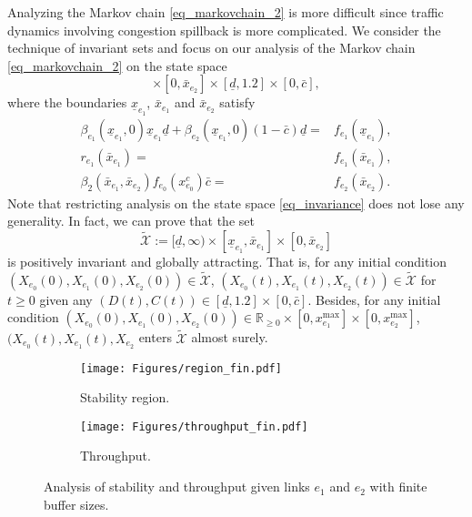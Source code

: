 Analyzing the Markov chain \eqref{eq_markovchain_2} is more difficult since traffic dynamics involving congestion spillback is more complicated. We consider the technique of invariant sets \cite{blanchini1999set} and focus on our analysis of the Markov chain \eqref{eq_markovchain_2} on the state space 
\begin{equation}
    [\underline{d}, \infty)\times [\underline{x}_{e_1}, \bar{x}_{e_1}]\times[0, \bar{x}_{e_2}]\times [\underline{d}, 1.2]\times[0, \bar{c}], \label{eq_invariance}
\end{equation}
where the boundaries $\underline x_{e_1}$, $\bar{x}_{e_1}$ and $\bar{x}_{e_2}$ satisfy 
\begin{subequations}
\begin{align}
    \beta_{e_1}(\underline{x}_{e_1}, 0)\underline{x}_{e_1}\underline{d}+\beta_{e_2}(\underline{x}_{e_1},0)(1-\bar{c})\underline{d} =& f_{e_1}(\underline{x}_{e_1}), \\
    r_{e_1}(\bar{x}_{e_1}) =& f_{e_1}(\bar{x}_{e_1}), \\
    \beta_2(\bar{x}_{e_1}, \bar{x}_{e_2}) f_{e_0}(x_{e_0}^c)\bar{c}=& f_{e_2}(\bar{x}_{e_2}).
\end{align}
\end{subequations}
Note that restricting analysis on the state space \eqref{eq_invariance} does not lose any generality. In fact, we can prove that the set
\begin{equation}
    \tilde{\mathcal{X}}:=[\underline{d}, \infty)\times [\underline{x}_{e_1}, \bar{x}_{e_1}]\times[0, \bar{x}_{e_2}]
\end{equation}
is positively invariant and globally attracting. That is, for any initial condition $(X_{e_0}(0), X_{e_1}(0), X_{e_2}(0))\in\tilde{\mathcal{X}}$, $(X_{e_0}(t), X_{e_1}(t), X_{e_2}(t))\in\tilde{\mathcal{X}}$ for $t\geq0$ given any $(D(t),C(t))\in[\underline{d},1.2]\times[0,\bar{c}]$. Besides, for any initial condition $(X_{e_0}(0), X_{e_1}(0), X_{e_2}(0))\in\mathbb{R}_{\geq0}\times[0,x_{e_1}^{\max}]\times[0, x_{e_2}^{\max}]$, $(X_{e_0}(t), X_{e_1}(t), X_{e_2}$ enters $\tilde{\mathcal{X}}$ almost surely. 

\begin{figure}[htbp]
    \centering
    \begin{subfigure}{0.45\linewidth}
    \centering
    \texttt{[image: Figures/region\_fin.pdf]}  
  \caption{Stability region.}
  \label{fig_fin_stability}
\end{subfigure}
\begin{subfigure}{0.45\linewidth}
  \centering
  \texttt{[image: Figures/throughput\_fin.pdf]}  
  \caption{Throughput.}
  \label{fig_fin_throughput}
\end{subfigure}
    \caption{Analysis of stability and throughput given links $e_1$ and $e_2$ with finite buffer sizes.}
    \label{fig_finite}
\end{figure}

